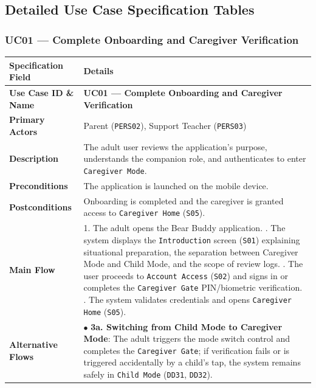 \subsection{Detailed Use Case Specification Tables}



\subsubsection{UC01 — Complete Onboarding and Caregiver Verification}


\noindent\begin{xltabular}{\textwidth}{|p{4.0cm}|X|}
\hline
\textbf{Specification Field} & \textbf{Details} \\ \hline
\endhead
\textbf{Use Case ID \& Name} & \textbf{UC01 — Complete Onboarding and Caregiver Verification} \\ \hline
\textbf{Primary Actors} & Parent (\texttt{PERS02}), Support Teacher (\texttt{PERS03}) \\ \hline
\textbf{Description} & The adult user reviews the application's purpose, understands the companion role, and authenticates to enter \texttt{Caregiver Mode}. \\ \hline
\textbf{Preconditions} & The application is launched on the mobile device. \\ \hline
\textbf{Postconditions} & Onboarding is completed and the caregiver is granted access to \texttt{Caregiver Home} (\texttt{S05}). \\ \hline
\textbf{Main Flow} & 1. The adult opens the Bear Buddy application. . The system displays the \texttt{Introduction} screen (\texttt{S01}) explaining situational preparation, the separation between Caregiver Mode and Child Mode, and the scope of review logs. . The user proceeds to \texttt{Account Access} (\texttt{S02}) and signs in or completes the \texttt{Caregiver Gate} PIN/biometric verification. . The system validates credentials and opens \texttt{Caregiver Home} (\texttt{S05}). \\ \hline
\textbf{Alternative Flows} & $\bullet$ \textbf{3a. Switching from Child Mode to Caregiver Mode}: The adult triggers the mode switch control and completes the \texttt{Caregiver Gate}; if verification fails or is triggered accidentally by a child's tap, the system remains safely in \texttt{Child Mode} (\texttt{DD31}, \texttt{DD32}). \\ \hline
\end{xltabular}



